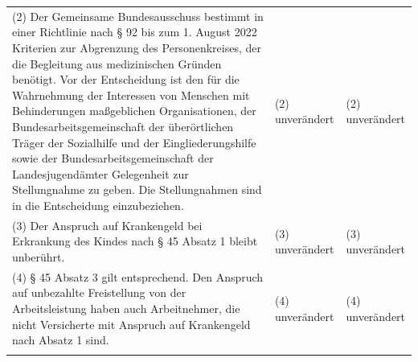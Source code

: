 \documentclass[10pt,a4paper,landscape]{article}
\begin{document}
\begin{longtable}{|L{8.2cm}|L{8.2cm}|L{8.2cm}|}
(2) Der Gemeinsame Bundesausschuss  \newline bestimmt in einer Richtlinie nach \S{} 92 bis  \newline zum 1. August 2022 Kriterien zur  \newline Abgrenzung des Personenkreises, der die  \newline Begleitung aus medizinischen Gründen  \newline benötigt. Vor der Entscheidung ist den für  \newline die Wahrnehmung der Interessen von  \newline Menschen mit Behinderungen  \newline maßgeblichen Organisationen, der  \newline Bundesarbeitsgemeinschaft der  \newline überörtlichen Träger der Sozialhilfe und der  \newline Eingliederungshilfe sowie der  \newline Bundesarbeitsgemeinschaft der  \newline Landesjugendämter Gelegenheit zur  \newline Stellungnahme zu geben. Die  \newline Stellungnahmen sind in die Entscheidung  \newline einzubeziehen. & (2) unverändert & (2) unverändert \\
\hhline{|---|}
(3) Der Anspruch auf Krankengeld bei  \newline Erkrankung des Kindes nach \S{} 45 Absatz 1  \newline bleibt unberührt. & (3) unverändert & (3) unverändert \\
\hhline{|---|}
(4) \S{} 45 Absatz 3 gilt entsprechend. Den  \newline Anspruch auf unbezahlte Freistellung von  \newline der Arbeitsleistung haben auch  \newline Arbeitnehmer, die nicht Versicherte mit  \newline Anspruch auf Krankengeld nach Absatz 1  \newline sind. & (4) unverändert & (4) unverändert \\
\hhline{|---|}
\end{longtable}
\newpage
\end{document}

